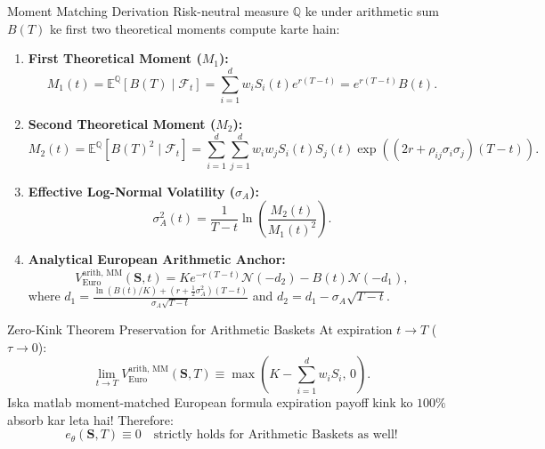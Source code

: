 \documentclass[11pt,a4paper,oneside]{book}
\begin{document}
\begin{mathbox}{Moment Matching Derivation}
Risk-neutral measure $\mathbb{Q}$ ke under arithmetic sum $B(T)$ ke first two theoretical moments compute karte hain:
\begin{enumerate}
    \item \textbf{First Theoretical Moment ($M_1$):}
    \begin{equation}
        M_1(t) = \mathbb{E}^\mathbb{Q}[B(T) \mid \mathcal{F}_t] = \sum_{i=1}^d w_i S_i(t) e^{r(T-t)} = e^{r(T-t)} B(t).
    \end{equation}
    \item \textbf{Second Theoretical Moment ($M_2$):}
    \begin{equation}
        M_2(t) = \mathbb{E}^\mathbb{Q}[B(T)^2 \mid \mathcal{F}_t] = \sum_{i=1}^d \sum_{j=1}^d w_i w_j S_i(t) S_j(t) \exp\left( (2r + \rho_{ij}\sigma_i\sigma_j)(T-t) \right).
    \end{equation}
    \item \textbf{Effective Log-Normal Volatility ($\sigma_A$):}
    \begin{equation}
        \sigma_A^2(t) = \frac{1}{T-t} \ln \left( \frac{M_2(t)}{M_1(t)^2} \right).
    \end{equation}
    \item \textbf{Analytical European Arithmetic Anchor:}
    \begin{equation}
        \boxed{V_{\text{Euro}}^{\text{arith, MM}}(\mathbf{S}, t) = K e^{-r(T-t)} \mathcal{N}(-d_2) - B(t) \mathcal{N}(-d_1),}
    \end{equation}
    where $d_1 = \frac{\ln(B(t)/K) + \left(r + \frac{1}{2}\sigma_A^2\right)(T-t)}{\sigma_A \sqrt{T-t}}$ and $d_2 = d_1 - \sigma_A \sqrt{T-t}$.
\end{enumerate}
\end{mathbox}

\begin{intuitionbox}{Zero-Kink Theorem Preservation for Arithmetic Baskets}
At expiration $t \to T$ ($\tau \to 0$):
\begin{equation}
    \lim_{t \to T} V_{\text{Euro}}^{\text{arith, MM}}(\mathbf{S}, T) \equiv \max\left( K - \sum_{i=1}^d w_i S_i, \, 0 \right).
\end{equation}
Iska matlab moment-matched European formula expiration payoff kink ko $100\%$ absorb kar leta hai!
Therefore:
\begin{equation}
    \boxed{e_\theta(\mathbf{S}, T) \equiv 0 \quad \text{strictly holds for Arithmetic Baskets as well!}}
\end{equation}
\end{intuitionbox}
\end{document}
